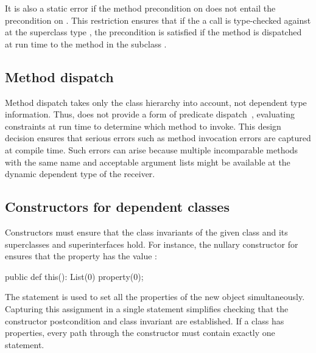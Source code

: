 It is also a static error if the method precondition on
 does
not entail the precondition on .  This restriction
ensures that if the a call
is type-checked against  at the superclass type ,
the precondition is satisfied if the method is dispatched at run time to the
method  in the subclass .

\subsection{Method dispatch}

Method dispatch takes only the class hierarchy into account, not 
dependent type information.  Thus, \Xten{} does not provide a
form of predicate dispatch~\cite{predicateClasses,jpred}, 
evaluating constraints at run time to determine which method to
invoke.
This design decision ensures that
serious errors such as method invocation errors are captured at
compile time. Such errors can arise because multiple incomparable
methods with the same name and acceptable argument lists might be
available at the dynamic dependent type of the receiver.

\subsection{Constructors for dependent classes}


Constructors must ensure that the class invariants of the given
class and its superclasses and superinterfaces hold.
For instance, the
nullary constructor for  ensures that the property
 has the value :
\begin{xtennoindent}
  public def this(): List(0) { property(0); }
\end{xtennoindent}
The  statement is used to set all the properties
of the new object simultaneously.  Capturing this assignment in
a single statement simplifies checking that the constructor
postcondition and class invariant are established.  If a class
has properties, every path through the constructor must contain
exactly one  statement.

